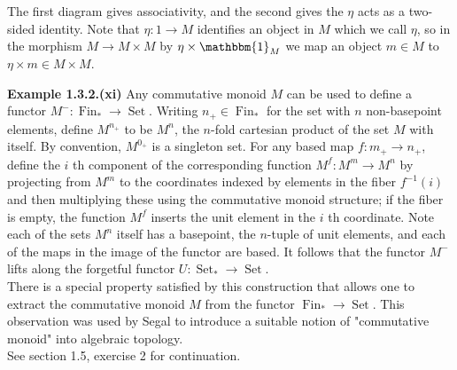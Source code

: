 \documentclass[a4paper]{article}
\theoremstyle{plain}%
\theoremstyle{definition}
\theoremstyle{remark}
\DeclareMathOperator{\Set}{Set}
\DeclareMathOperator{\Fin}{Fin}
\begin{document}
\begin{center}
\end{center}
The first diagram gives associativity, and the second gives the $\eta$ acts as
a two-sided identity. Note that $\eta  \colon 1 \to M$ identifies an object in
$M$ which we call $\eta$, so in the morphism  $M \to M \times M$ by
$\eta \times \mathbbm{1}_{M}$ we map an object $m \in M$ to
$\eta \times m \in M \times M$.\\
\linebreak







 \textbf{Example 1.3.2.(xi)} Any commutative monoid $M$ can be used to define
 a functor $M^{-}  \colon \Fin_{*} \to \Set$. Writing $n_+ \in \Fin_*$ for the
 set with $n$ non-basepoint elements, define $M^{n_+}$ to be
 $M^{n}$, the $n$-fold cartesian product of the set $M$ with itself. By
 convention, $M^{0_+}$ is a singleton set. For any based map
 $f  \colon m_+ \to n_+$, define the $i$ th component of the corresponding
 function
 $M^{f}  \colon M^{m} \to M^{n}$ by projecting from $M^{m}$ to the coordinates
 indexed by elements in the fiber $f^{-1}(i)$ and then multiplying these using
 the commutative monoid structure; if the fiber is empty, the function $M^{f}$ 
 inserts the unit element in the $i$ th coordinate. Note each of the sets
 $M^{n}$ itself has a basepoint, the $n$-tuple of unit elements, and each of
 the maps in the image of the functor are based. It follows that the functor
 $M^{-}$ lifts along the forgetful functor $U  \colon \Set_* \to \Set$.\\
 \linebreak
 There is a special property satisfied by this construction that allows one to
 extract the commutative monoid $M$ from the functor $\Fin_* \to \Set$. This
 observation was used by Segal to introduce a suitable notion of "commutative
 monoid" into algebraic topology.\\
 \linebreak
 See section 1.5, exercise 2 for continuation.
 
\end{document}
